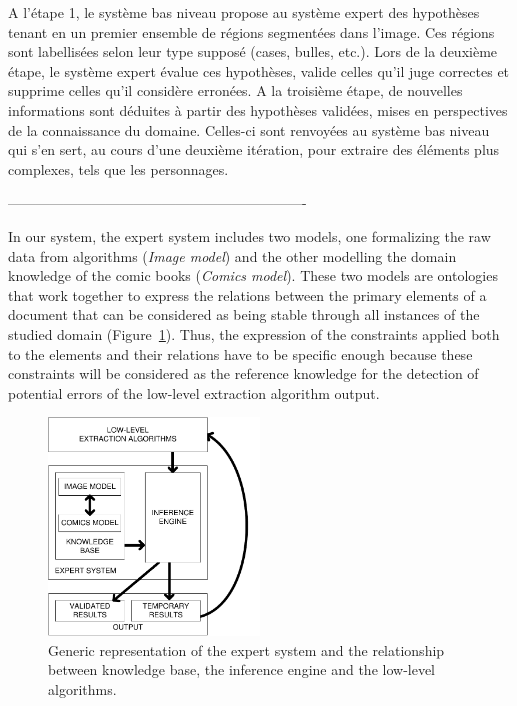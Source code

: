 {A l'étape 1, le système bas niveau propose au système expert des hypothèses tenant en un premier ensemble de régions segmentées dans l'image.
Ces régions sont labellisées selon leur type supposé (cases, bulles, etc.).
Lors de la deuxième étape, le système expert évalue ces hypothèses, valide celles qu'il juge correctes et supprime celles qu'il considère erronées.
A la troisième étape, de nouvelles informations sont déduites à partir des hypothèses validées, mises en perspectives de la connaissance du domaine.
Celles-ci sont renvoyées au système bas niveau qui s'en sert, au cours d'une deuxième itération, pour extraire des éléments plus complexes, tels que les personnages.
}

----------------------------------------------------------------

In our system, the expert system includes two models, one formalizing the raw data from algorithms (\emph{Image model}) and the other modelling the domain knowledge of the comic books (\emph{Comics model}).
These two models are ontologies that work together to
express the relations between the primary elements of a document that can be considered as being stable through all instances of the studied domain (Figure~\ref{fig:kn:generic_expert_system}).
Thus, the expression of the constraints applied both to the elements and their relations have to be specific enough because these constraints will be considered as the reference knowledge for the detection of potential errors of the low-level extraction algorithm output.

 \begin{figure}[!ht]  %
   \centering
  \includegraphics[trim= 0px 0px 0px 0px, clip, width=0.5\textwidth]{expert_system.pdf}
  \caption[Generic representation of the expert system and the relationship between knowledge base, the inference engine and the low-level algorithms]{Generic representation of the expert system and the relationship between knowledge base, the inference engine and the low-level algorithms.}
  \label{fig:kn:generic_expert_system}
 \end{figure}


